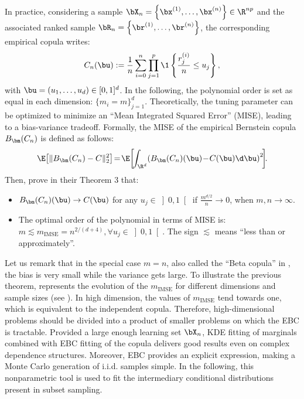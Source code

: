 In practice, considering a sample $\bX_n = \left\{\bx^{(1)}, \dots, \bx^{(n)}\right\} \in \R^{np}$ and the associated ranked sample $\bR_n = \left\{\br^{(1)}, \dots, \br^{(n)}\right\}$, the corresponding empirical copula writes: 
\begin{equation}
    C_n(\bu) := \frac1n \sum_{i=0}^{n} \prod_{j=1}^{p} \1 \left\{ \frac{r_j^{(i)}}{n} \leq u_j \right\},
\end{equation}
with $\bu = (u_1, \dots, u_d) \in [0, 1]^d$. In the following, the polynomial order is set as equal in each dimension: $\{m_i = m\}_{j=1}^d$. 
Theoretically, the tuning parameter can be optimized to minimize an ``Mean Integrated Squared Error'' (MISE), leading to a bias-variance tradeoff. 
Formally, the MISE of the empirical Bernstein copula $B_{\bm}(C_n)$ is defined as follows:
\begin{equation}
    \E\!\left[ \lVert B_{\bm}(C_n) - C \rVert^2_2 \right] \!=\! \E\!\left[\!\int_{\R^d}\! \left(B_{\bm}(C_n)(\bu) \!-\! C(\bu) \d \bu \right)^2 \!\right]\!\!.
    \label{eq:kimse}
\end{equation}
Then, \cite{sancetta_satchell_2004} prove in their Theorem 3 that: 
\begin{itemize}
    \item $B_{\bm}(C_n)(\bu) \rightarrow C(\bu)$ for any $u_j \in \left]0, 1\right[$ if $\frac{m^{d/2}}{n} \rightarrow 0$, when $m, n \rightarrow \infty$.
    \item The optimal order of the polynomial in terms of MISE is: $m \lesssim m_{\mathrm{IMSE}} = n^{2/(d+4)}, \forall u_j \in \left]0, 1\right[$. The sign $\lesssim$ means ``less than or approximately''.
\end{itemize}

Let us remark that in the special case $m = n$, also called the ``Beta copula'' in \cite{segers_2017}, the bias is very small while the variance gets large. 
To illustrate the previous theorem, \cite{lasserre_2022} represents the evolution of the $m_{\mathrm{IMSE}}$ for different dimensions and sample sizes (see ). 
In high dimension, the values of $m_{\mathrm{IMSE}}$ tend towards one, which is equivalent to the independent copula. 
Therefore, high-dimensional problems should be divided into a product of smaller problems on which the EBC is tractable. 
Provided a large enough learning set $\bX_n$, KDE fitting of marginals combined with EBC fitting of the copula delivers good results even on complex dependence structures. 
Moreover, EBC provides an explicit expression, making a Monte Carlo generation of i.i.d. samples simple. 
In the following, this nonparametric tool is used to fit the intermediary conditional distributions present in subset sampling.  

